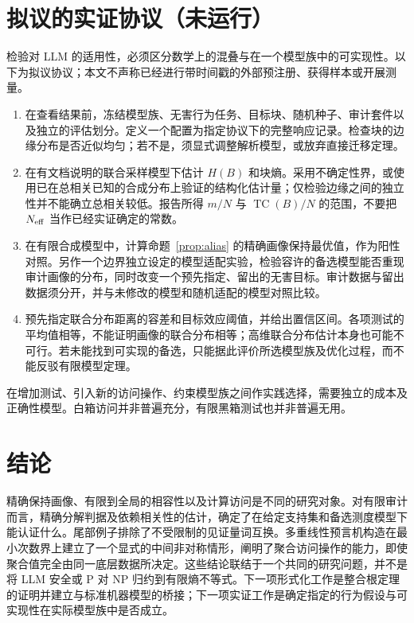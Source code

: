 \documentclass[11pt,a4paper]{article}
\newcommand{\TC}{\operatorname{TC}}
\begin{document}
\section{拟议的实证协议（未运行）}
检验对 LLM 的适用性，必须区分数学上的混叠与在一个模型族中的可实现性。以下为拟议协议；本文不声称已经进行带时间戳的外部预注册、获得样本或开展测量。
\begin{enumerate}
\item 在查看结果前，冻结模型族、无害行为任务、目标块、随机种子、审计套件以及独立的评估划分。定义一个配置为指定协议下的完整响应记录。检查块的边缘分布是否近似均匀；若不是，须显式调整解析模型，或放弃直接迁移定理。
\item 在有文档说明的联合采样模型下估计 $H(B)$ 和块熵。采用不确定性界，或使用已在总相关已知的合成分布上验证的结构化估计量；仅检验边缘之间的独立性并不能确立总相关较低。报告所得 $m/N$ 与 $\TC(B)/N$ 的范围，不要把 $N_{\rm eff}$ 当作已经实证确定的常数。
\item 在有限合成模型中，计算命题~\ref{prop:alias} 的精确画像保持最优值，作为阳性对照。另作一个边界独立设定的模型适配实验，检验容许的备选模型能否重现审计画像的分布，同时改变一个预先指定、留出的无害目标。审计数据与留出数据须分开，并与未修改的模型和随机适配的模型对照比较。
\item 预先指定联合分布距离的容差和目标效应阈值，并给出置信区间。各项测试的平均值相等，不能证明画像的联合分布相等；高维联合分布估计本身也可能不可行。若未能找到可实现的备选，只能据此评价所选模型族及优化过程，而不能反驳有限模型定理。
\end{enumerate}
在增加测试、引入新的访问操作、约束模型族之间作实践选择，需要独立的成本及正确性模型。白箱访问并非普遍充分，有限黑箱测试也并非普遍无用。

\section{结论}
精确保持画像、有限到全局的相容性以及计算访问是不同的研究对象。对有限审计而言，精确分解判据及依赖相关性的估计，确定了在给定支持集和备选测度模型下能认证什么。尾部例子排除了不受限制的见证量词互换。多重线性预言机构造在最小次数界上建立了一个显式的中间非对称情形，阐明了聚合访问操作的能力，即使聚合值完全由同一底层数据所决定。这些结论联结于一个共同的研究问题，并不是将 LLM 安全或 P 对 NP 归约到有限熵不等式。下一项形式化工作是整合根定理的证明并建立与标准机器模型的桥接；下一项实证工作是确定指定的行为假设与可实现性在实际模型族中是否成立。
\end{document}
